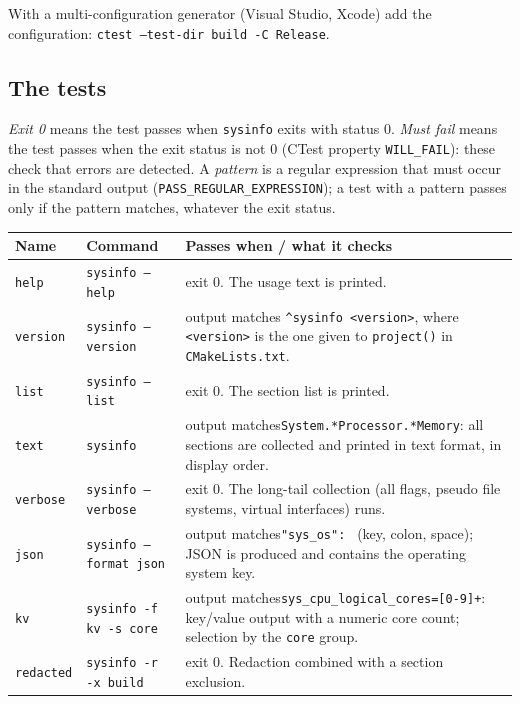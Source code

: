 \documentclass[11pt,a4paper]{article}
\newcommand{\cmd}[1]{\texttt{#1}}
\newcommand{\prog}{\texttt{sysinfo}}
\begin{document}
With a multi-configuration generator (Visual Studio, Xcode) add the configuration: \cmd{ctest --test-dir build -C Release}.

\subsection{The tests}

\emph{Exit 0} means the test passes when \prog{} exits with status 0. \emph{Must fail} means the test passes when
the exit status is not 0 (CTest property \texttt{WILL\_FAIL}): these check that errors are detected. A \emph{pattern} is a
regular expression that must occur in the standard output (\texttt{PASS\_REGULAR\_EXPRESSION}); a test with a pattern passes
only if the pattern matches, whatever the exit status.

{\small
\begin{longtable}{@{}l p{4.9cm} p{7.2cm}@{}}
\toprule
Name & Command & Passes when / what it checks \\
\midrule \endhead
\texttt{help}     & \cmd{sysinfo --help}    & exit 0. The usage text is printed. \\
\texttt{version}  & \cmd{sysinfo --version} & output matches \texttt{\^{}sysinfo <version>}, where \texttt{<version>} is the one given to
                    \cmd{project()} in \cmd{CMakeLists.txt}. \\
\texttt{list}     & \cmd{sysinfo --list}    & exit 0. The section list is printed. \\
\texttt{text}     & \cmd{sysinfo}           & output matches\newline\texttt{System.*Processor.*Memory}: all sections are collected and printed in text
                    format, in display order. \\
\texttt{verbose}  & \cmd{sysinfo --verbose} & exit 0. The long-tail collection (all flags, pseudo file systems, virtual interfaces) runs. \\
\texttt{json}     & \cmd{sysinfo --format json} & output matches\newline\texttt{"sys\_os": } (key, colon, space); JSON is produced and contains the operating system key. \\
\texttt{kv}       & \cmd{sysinfo -f kv -s core} & output matches\newline\texttt{sys\_cpu\_logical\_cores=[0-9]+}: key/value output with a numeric core
                    count; selection by the \texttt{core} group. \\
\texttt{redacted} & \cmd{sysinfo -r -x build}   & exit 0. Redaction combined with a section exclusion. \\

\end{longtable}}
\end{document}
